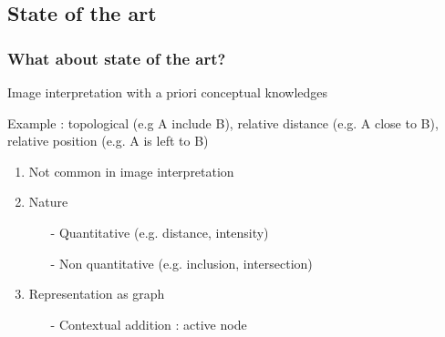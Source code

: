 	\subsection[State of the art]{State of the art}
		\begin{frame}
		\frametitle{What about state of the art?}
		
		\begin{block}{Image interpretation with a priori conceptual knowledges}

				Example : topological (e.g A include B), relative distance (e.g. A close to B), relative position (e.g. A is left to B)
			\begin{enumerate}
				\item Not common in image interpretation
				\item Nature
				\begin{enumerate}
					\item[-] Quantitative (e.g. distance, intensity)\footnotemark[1]
					\item[-] Non quantitative (e.g. inclusion, intersection)\footnotemark[2]
				\end{enumerate}
				\item Representation as graph\footnotemark[3]
				\begin{enumerate}
					\item[-] Contextual addition : active node\footnotemark[2]		%
				\end{enumerate}				
			\end{enumerate}
			

\end{block}
\end{frame}
